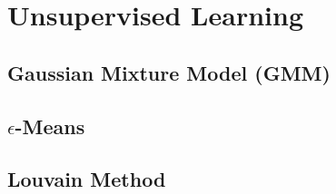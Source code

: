 \section{Unsupervised Learning}
\label{additional:unsupervised}

\subsection{Gaussian Mixture Model (GMM)}
\label{additional:unsupervised:GMM}

\subsection{\texorpdfstring{$\epsilon$}{epsilon}-Means}
\label{additional:unsupervised:epsilonMean}

\subsection{Louvain Method}
\label{additional:unsupervised:louvain}

